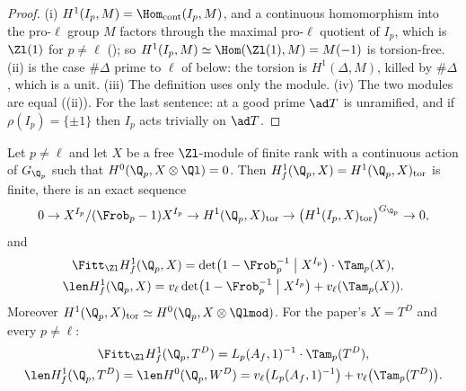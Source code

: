 \begin{proof}
(i) $H^1(I_p,M)=\Hom_{\mathrm{cont}}(I_p,M)$, and a continuous homomorphism into the pro-$\ell$ group $M$ factors through the maximal pro-$\ell$ quotient of $I_p$, which is $\Zl(1)$
for $p\ne\ell$ (); so $H^1(I_p,M)\simeq\Hom(\Zl(1),M)=M(-1)$ is torsion-free. (ii) is the case $\#\Delta$ prime to $\ell$ of 
below: the torsion is $H^1(\Delta,M)$, killed by $\#\Delta$, which is a unit. (iii) The definition uses only the module. (iv) The two modules are equal
((ii)). For the last sentence: at a good prime $\ad T$ is unramified, and if $\rho(I_p)=\{\pm1\}$ then $I_p$ acts trivially on $\ad T$.
\end{proof}

\begin{theorem}\label{thm:blochkato:fpr-local}
Let $p\ne\ell$ and let $X$ be a free $\Zl$-module of finite rank with a continuous action of $G_{\Q_p}$ such that $H^0(\Q_p,X\otimes\Ql)=0$. Then $H^1_f(\Q_p,X)=H^1(\Q_p,X)_{\mathrm{tor}}$ is
finite, there is an exact sequence
\[
0\to X^{I_p}/(\Frob_p-1)X^{I_p}\to H^1(\Q_p,X)_{\mathrm{tor}}\to\bigl(H^1(I_p,X)_{\mathrm{tor}}\bigr)^{G_{\Q_p}}\to0,
\]
and
\begin{gather*}
\Fitt_{\Zl}H^1_f(\Q_p,X)=\det\bigl(1-\Frob_p^{-1}\bigm|X^{I_p}\bigr)\cdot\Tam_p(X),\\
\len H^1_f(\Q_p,X)=v_\ell\det\bigl(1-\Frob_p^{-1}\bigm|X^{I_p}\bigr)+v_\ell(\Tam_p(X)).
\end{gather*}
Moreover $H^1(\Q_p,X)_{\mathrm{tor}}\simeq H^0(\Q_p,X\otimes\Qlmod)$. For the paper's $X=T^D$ and every $p\ne\ell$:
\begin{gather*}
\Fitt_{\Zl}H^1_f(\Q_p,T^D)=L_p(A_f,1)^{-1}\cdot\Tam_p(T^D),\\
\len H^1_f(\Q_p,T^D)=\len H^0(\Q_p,W^D)=v_\ell\bigl(L_p(A_f,1)^{-1}\bigr)+v_\ell\bigl(\Tam_p(T^D)\bigr).
\end{gather*}
\end{theorem}

